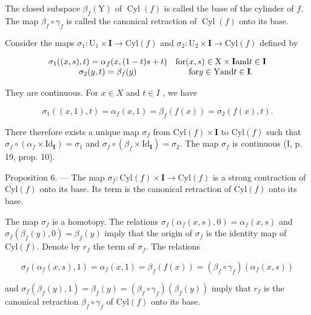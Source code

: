 The closed subspace \(\beta_{f}(\mathrm{Y})\) of \(\operatorname{Cyl}(f)\) is called the base of the cylinder of \(f\). The map \(\beta_{f} \circ \gamma_{f}\) is called the canonical retraction of \(\operatorname{Cyl}(f)\) onto its base.

Consider the maps \(\sigma_{1}\colon\mathrm{U}_{1}\times\mathbf{I}\to\mathrm{Cyl}(f)\) and \(\sigma_{2}\colon\mathrm{U}_{2}\times\mathbf{I}\to\mathrm{Cyl}(f)\) defined by

\[
\begin{array}{c c} \sigma_ {1} ((x, s), t) = \alpha_ {f} (x, (1 - t) s + t) & \text {for} (x, s) \in \mathrm{X} \times \mathbf {I} \text {and} t \in \mathbf {I} \\ \sigma_ {2} (y, t) = \beta_ {f} (y) & \text {for} y \in \mathrm{Y} \text {and} t \in \mathbf {I}. \end{array}
\]

They are continuous. For \(x \in X\) and \(t \in I\) , we have

\[
\sigma_ {1} ((x, 1), t) = \alpha_ {f} (x, 1) = \beta_ {f} (f (x)) = \sigma_ {2} (f (x), t).
\]

There therefore exists a unique map \(\sigma_{f}\) from \(\mathrm{Cyl}(f)\times\mathbf{I}\) to \(\mathrm{Cyl}(f)\) such that \(\sigma_{f}\circ(\alpha_{f}\times\mathrm{Id}_{\mathbf{I}})=\sigma_{1}\) and \(\sigma_{f}\circ(\beta_{f}\times\mathrm{Id}_{\mathbf{I}})=\sigma_{2}\). The map \(\sigma_{f}\) is continuous (I, p. 19, prop. 10).

Proposition 6. — The map \(\sigma_{f}\colon\mathrm{Cyl}(f)\times\mathbf{I}\to\mathrm{Cyl}(f)\) is a strong contraction of \(\mathrm{Cyl}(f)\) onto its base. Its term is the canonical retraction of \(\mathrm{Cyl}(f)\) onto its base.

The map \(\sigma_f\) is a homotopy. The relations \(\sigma_f(\alpha_f(x,s),0) = \alpha_f(x,s)\) and \(\sigma_f(\beta_f(y),0) = \beta_f(y)\) imply that the origin of \(\sigma_f\) is the identity map of \(\mathrm{Cyl}(f)\). Denote by \(r_f\) the term of \(\sigma_f\). The relations

\[
\sigma_ {f} \left(\alpha_ {f} (x, s), 1\right) = \alpha_ {f} (x, 1) = \beta_ {f} (f (x)) = \left(\beta_ {f} \circ \gamma_ {f}\right) \left(\alpha_ {f} (x, s)\right)
\]

and \(\sigma_{f}(\beta_{f}(y),1) = \beta_{f}(y) = (\beta_{f}\circ \gamma_{f})(\beta_{f}(y))\) imply that \(r_f\) is the canonical retraction \(\beta_{f}\circ \gamma_{f}\) of \(\mathrm{Cyl}(f)\) onto its base.

